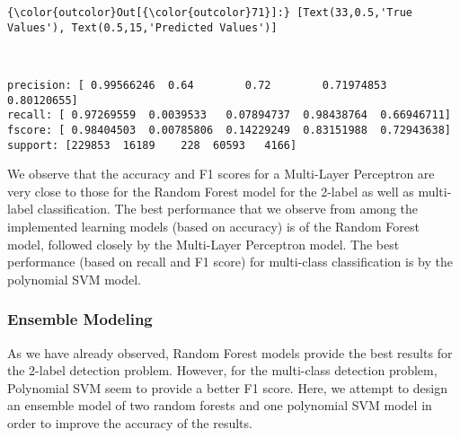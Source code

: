 \documentclass[11pt]{article}
\begin{document}
\begin{Verbatim}[commandchars=\\\{\}]
{\color{outcolor}Out[{\color{outcolor}71}]:} [Text(33,0.5,'True Values'), Text(0.5,15,'Predicted Values')]
\end{Verbatim}
            
    \begin{center}
    \end{center}
    { \hspace*{\fill} \\}
    
    \begin{Verbatim}[commandchars=\\\{\}]
precision: [ 0.99566246  0.64        0.72        0.71974853  0.80120655]
recall: [ 0.97269559  0.0039533   0.07894737  0.98438764  0.66946711]
fscore: [ 0.98404503  0.00785806  0.14229249  0.83151988  0.72943638]
support: [229853  16189    228  60593   4166]

    \end{Verbatim}

    We observe that the accuracy and F1 scores for a Multi-Layer Perceptron
are very close to those for the Random Forest model for the 2-label as
well as multi-label classification. The best performance that we observe
from among the implemented learning models (based on accuracy) is of the
Random Forest model, followed closely by the Multi-Layer Perceptron
model. The best performance (based on recall and F1 score) for
multi-class classification is by the polynomial SVM model.

    \subsubsection{Ensemble Modeling}\label{ensemble-modeling}

As we have already observed, Random Forest models provide the best
results for the 2-label detection problem. However, for the multi-class
detection problem, Polynomial SVM seem to provide a better F1 score.
Here, we attempt to design an ensemble model of two random forests and
one polynomial SVM model in order to improve the accuracy of the
results.
\end{document}
